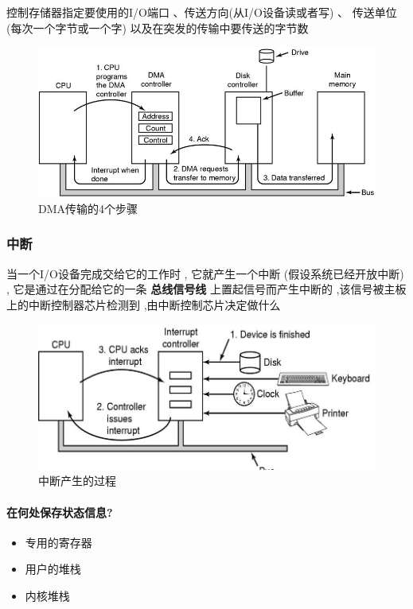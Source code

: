 \documentclass[UTF8,a4paper]{ctexart}
\begin{document}
控制存储器指定要使用的I/O端口 、传送方向(从I/O设备读或者写) 、 传送单位(每次一个字节或一个字) 以及在突发的传输中要传送的字节数

\begin{figure}[H]
	\centering
	\includegraphics[scale = 0.5]{assets/ModernOperatingSystems/2018-01-10-16-05-53.png}
	\caption{DMA传输的4个步骤}
\end{figure}

\subsubsection{中断}
当一个I/O设备完成交给它的工作时 , 它就产生一个中断 (假设系统已经开放中断) , 它是通过在分配给它的一条 \textbf{总线信号线} 上置起信号而产生中断的 ,该信号被主板上的中断控制器芯片检测到 ,由中断控制芯片决定做什么

\begin{figure}[H]
	\centering
	\includegraphics[scale = 0.5]{assets/ModernOperatingSystems/2018-01-10-16-10-14.png}
	\caption{中断产生的过程}
\end{figure}

\paragraph{在何处保存状态信息?}
\begin{itemize}
	\item 专用的寄存器 
	\item 用户的堆栈
	\item 内核堆栈
\end{itemize}
\end{document}
